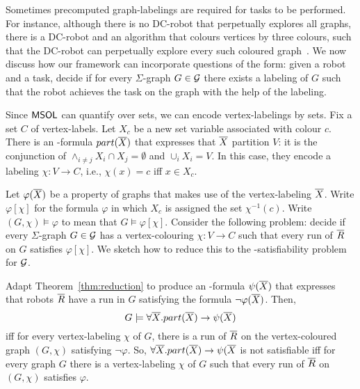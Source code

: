 

Sometimes precomputed graph-labelings are required for tasks to be performed. For instance, although there is no DC-robot that perpetually explores all graphs, there is a DC-robot and an algorithm that colours vertices by three colours, such that the DC-robot can perpetually explore every such coloured graph~\cite{Cohen05graphexploration}. We now discuss how our framework can incorporate questions of the form: given a robot and a task, decide if for every $\Sigma$-graph $G \in \mathcal{G}$ there exists a labeling of $G$ such that the robot achieves the task on the graph with the help of the labeling. 

Since $\mathsf{MSOL}$ can quantify over sets, we can encode vertex-labelings by sets. Fix a set $C$ of vertex-labels. Let 
$X_c$ be a new set variable associated with colour $c$.  There is an \msol-formula $part(\overline{X})$ that expresses that $\overline{X}$ partition $V$: it is the conjunction of $\wedge_{i\neq j} X_i \cap X_j = \emptyset$ and $\cup_{i} X_i = V$.
In this case, they encode a labeling $\chi:V \to C$, i.e., $\chi(x) = c$ iff $x \in X_c$. 

Let $\varphi(\overline{X})$ be a property of graphs that makes use of the vertex-labeling $\overline{X}$. Write $\varphi[\chi]$ for the formula $\varphi$ in which $X_c$ is assigned the set $\chi^{-1}(c)$. Write $(G,\chi) \models \varphi$ to mean that $G \models \varphi[\chi]$.
Consider the following problem: decide if every $\Sigma$-graph $G \in \mathcal{G}$ has a vertex-colouring $\chi:V \to C$ such that every run of $\overline{R}$ on $G$
satisfies $\varphi[\chi]$. We sketch how to reduce this to the \msol-satisfiability problem for $\mathcal{G}$.

Adapt Theorem~\ref{thm:reduction} to produce an \msol-formula $\psi(\overline{X})$ that expresses that robots $\overline{R}$ have a run in $G$ 
satisfying the \RLTL formula $\neg \varphi(\overline{X})$. 
Then,  
\[
G  \models \forall \overline{X}. part(\overline{X}) \to \psi(\overline{X}) 
\]
 iff for every vertex-labeling $\chi$ of $G$, there is a run of $\overline{R}$ on the vertex-coloured graph $(G,\chi)$ satisfying $\neg \varphi$. So, $\forall \overline{X}. part(\overline{X}) \to \psi(\overline{X}$ is not satisfiable iff for every graph $G$ there is a vertex-labeling $\chi$ of $G$ such that every run of $\overline{R}$ on $(G,\chi)$ satisfies $\varphi$. 

